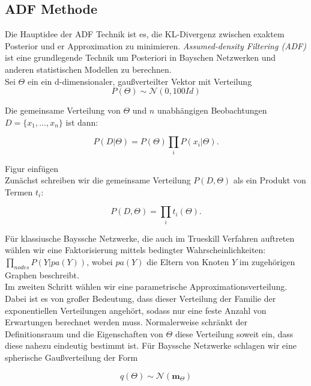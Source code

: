 \documentclass[12pt,a4paper]{scrartcl}
\numberwithin{equation}{section}
\begin{document}
{  \subsection{ADF Methode}
  
  Die Hauptidee der ADF Technik ist es, die KL-Divergenz zwischen exaktem Posterior und er Approximation zu minimieren.
  \textit{Assumed-density Filtering (ADF)} ist eine grundlegende Technik um Posteriori in Bayschen Netzwerken
  und anderen statistischen Modellen zu berechnen. \\
  Sei $\Theta$ ein ein d-dimensionaler, gaußverteilter Vektor mit Verteilung 
  \begin{equation}
   P(\Theta) \sim \mathcal{N}(0,100Id)
  \end{equation}
  
  Die gemeinsame Verteilung von $\Theta$ und $n$ unabhängigen Beobachtungen $D = \{x_1,...,x_n\}$ ist dann: 
  
  \begin{equation}
   P(D|\Theta) = P(\Theta) \prod_i P(x_i|\Theta).
  \end{equation}
  
  Figur einfügen \\
  
  Zunächst schreiben wir die gemeinsame Verteilung $P(D, \Theta)$ als ein Produkt von Termen
  $t_i$: 
  
  \begin{equation}
   P(D, \Theta) = \prod_i t_i(\Theta).
  \end{equation}
  
  Für klassiusche Bayssche Netzwerke, die auch im Trueskill Verfahren auftreten wählen wir eine 
  Faktorisierung mittels bedingter Wahrscheinlichkeiten: $\prod_{nodes} P(Y|pa(Y))$, wobei $pa(Y)$
  die Eltern von Knoten $Y$ im zugehörigen Graphen beschreibt. \\
  Im zweiten Schritt wählen wir eine parametrische Approximationsverteilung. Dabei ist es von großer Bedeutung, 
  dass dieser Verteilung der Familie der exponentiellen Verteilungen angehört, sodass nur eine feste Anzahl 
  von Erwartungen berechnet werden muss. 
  Normalerweise schränkt der Definitionsraum und die Eigenschaften von $\Theta$ diese Verteilung soweit ein, dass 
  diese nahezu eindeutig bestimmt ist. 
  Für Bayssche Netzwerke schlagen wir eine spherische Gaußverteilung der Form
  
  \begin{equation}
   q(\Theta) \sim \mathcal{N}(\mathbf{m}_{\Theta})
  \end{equation}

}
\end{document}
